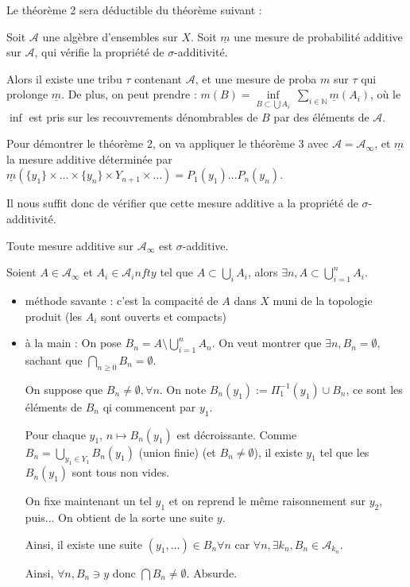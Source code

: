 \documentclass[10pt,a4paper,notitlepage ]{report}
\begin{document}
Le théorème 2 sera déductible du théorème suivant :
\begin{theorem}
	Soit $\mathcal A$ une algèbre d'ensembles sur $X$. Soit $\underline m$ une mesure de probabilité additive sur $\mathcal A$, qui vérifie la propriété de $\sigma$-additivité.
	
	Alors il existe une tribu $\tau$ contenant $\mathcal A$, et une mesure de proba $m$ sur $\tau$ qui prolonge $\underline m$. De plus, on peut prendre : $m(B) = \underset{B \subset \bigcup A_i} \inf \  \underset{i \in \mathbb N}{\sum} \underline m (A_i)$, où le $\inf$ est pris sur les recouvrements dénombrables de $B$ par des éléments de $\mathcal A$.
\end{theorem}

Pour démontrer le théorème 2, on va appliquer le théorème 3 avec $\mathcal A = \mathcal A_\infty$, et $\underline m$ la mesure additive déterminée par $\underline m (\{y_1\}\times \dots \times \{y_n\} \times Y_{n+1} \times \dots) = P_1(y_1) \dots P_n(y_n)$.

Il nous suffit donc de vérifier que cette mesure additive a la propriété de $\sigma$-additivité.

\begin{propriete}
	Toute mesure additive sur $\mathcal A_\infty$ est $\sigma$-additive.
\end{propriete}

\begin{demo}
	Soient $A \in \mathcal A_\infty$ et $A_i \in \mathcal A_infty$ tel que $A \subset \underset i \bigcup A_i$, alors $\exists n, A \subset \bigcup_{i=1}^n A_i$.
	
	\begin{itemize}
		\item méthode savante : c'est la compacité de $A$ dans $X$ muni de la topologie produit (les $A_i$ sont ouverts et compacts)
		\item à la main :
		On pose $B_n = A \setminus \bigcup_{i=1}^n A_n$. On veut montrer que $\exists n, B_n = \emptyset$, sachant que $\underset {n\ge 0}\bigcap B_n = \emptyset$.
		
		On suppose que $B_n \ne \emptyset, \forall n$. On note $B_n(y_1) := \Pi_1^{-1}(y_1) \cup B_n$, ce sont les éléments de $B_n$ qi commencent par $y_1$.
		
		Pour chaque $y_1$, $n \mapsto B_n(y_1)$ est décroissante. Comme $B_n = \underset {y_1 \in Y_1} \bigcup B_n(y_1)$ (union finie) (et $B_n \ne \emptyset$), il existe $y_1$ tel que les $B_n(y_1)$ sont tous non vides.
		
		On fixe maintenant un tel $y_1$ et on reprend le même raisonnement sur $y_2$, puis... On obtient de la sorte une suite $y$.
		
		Ainsi, il existe une suite $(y_1, \dots) \in B_n \forall n$ car $\forall n, \exists k_n, B_n\in\mathcal A_{k_n}$.
		
		Ainsi, $\forall n, B_n \ni y$ donc $\bigcap B_n \ne \emptyset$. Absurde.
	\end{itemize}
\end{demo}
\end{document}
